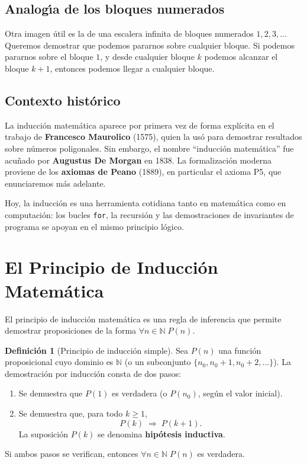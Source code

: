 \documentclass[11pt,a4paper]{article}
\theoremstyle{definition}
\newtheorem{definicion}{Definici\'on}[section]
\theoremstyle{plain}
\theoremstyle{definition}
\theoremstyle{definition}
\theoremstyle{remark}
\newcommand{\N}{\mathbb{N}}               %
\newcommand{\implica}{\Rightarrow}         %
\newcommand{\para}{\forall}               %
\begin{document}
\subsection*{Analog\'{\i}a de los bloques numerados}

Otra imagen \'util es la de una escalera infinita de bloques numerados $1, 2, 3,
\ldots$ Queremos demostrar que podemos pararnos sobre cualquier bloque.
Si podemos pararnos sobre el bloque $1$, y desde cualquier bloque $k$ podemos
alcanzar el bloque $k+1$, entonces podemos llegar a cualquier bloque.

\subsection*{Contexto hist\'orico}

La inducci\'on matem\'atica aparece por primera vez de forma expl\'icita en el
trabajo de \textbf{Francesco Maurolico} (1575), quien la us\'o para demostrar
resultados sobre n\'umeros poligonales. Sin embargo, el nombre
\enquote{inducci\'on matem\'atica} fue acu\~nado por \textbf{Augustus De Morgan}
en 1838. La formalizaci\'on moderna proviene de los \textbf{axiomas de Peano}
(1889), en particular el axioma P5, que enunciaremos m\'as adelante.

Hoy, la inducci\'on es una herramienta cotidiana tanto en matem\'atica como en
computaci\'on: los bucles \texttt{for}, la recursi\'on y las demostraciones de
invariantes de programa se apoyan en el mismo principio l\'ogico.

\section{El Principio de Inducci\'on Matem\'atica}

El principio de inducci\'on matem\'atica es una regla de inferencia que permite
demostrar proposiciones de la forma $\para n\in\N\; P(n)$.

\begin{definicion}[Principio de inducci\'on simple]
\label{def:induccion}
Sea $P(n)$ una funci\'on proposicional cuyo dominio es $\N$ (o un subconjunto
$\{n_0, n_0+1, n_0+2,\dots\}$). La demostraci\'on por inducci\'on consta de dos
pasos:
\begin{enumerate}
    \item[\textbf{Paso base:}] Se demuestra que $P(1)$ es verdadera
          (o $P(n_0)$, seg\'un el valor inicial).
    \item[\textbf{Paso inductivo:}] Se demuestra que, para todo $k\geq 1$,
          \[
          P(k) \;\implica\; P(k+1).
          \]
          La suposici\'on $P(k)$ se denomina \textbf{hip\'otesis inductiva}.
\end{enumerate}
Si ambos pasos se verifican, entonces $\para n\in\N\; P(n)$ es verdadera.
\end{definicion}
\end{document}
